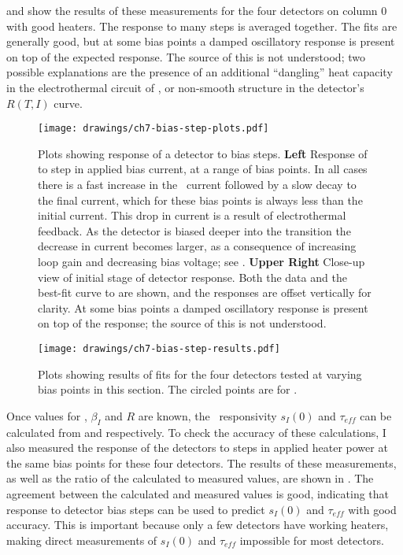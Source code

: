  and  show the results of these measurements for the four detectors on column 0 with good heaters.
The response to many steps is averaged together.
The fits are generally good, but at some bias points a damped oscillatory response is present on top of the expected  response.
The source of this is not understood; two possible explanations are the presence of an additional ``dangling'' heat capacity in the electrothermal circuit of  \cite{hoevers_thermal_2000,zink_array-compatible_2006,maasilta_complex_2012}, or non-smooth structure in the detector's $R(T,I)$ curve.

\begin{figure*}
  \centering
\texttt{[image: drawings/ch7-bias-step-plots.pdf]}
\caption[Plots showing response of a detector to bias steps]{
  Plots showing response of a detector to bias steps.
\textbf{Left}
Response of  to step in applied bias current, at a range of bias points.
In all cases there is a fast increase in the \TES\ current followed by a slow decay to the final current, which for these bias points is always less than the initial current.
This drop in current is a result of electrothermal feedback.
As the detector is biased deeper into the transition the decrease in current becomes larger, as a consequence of increasing loop gain and decreasing bias voltage; see .
\textbf{Upper Right}
Close-up view of initial stage of detector response.
Both the data and the best-fit curve to  are shown, and the responses are offset vertically for clarity.
At some bias points a damped oscillatory response is present on top of the  response; the source of this is not understood.
}
\label{fig:ch7-bias-step-plots}
\end{figure*}

\begin{figure*}
  \centering
\texttt{[image: drawings/ch7-bias-step-results.pdf]}
\caption[Results of bias step fits]{
  Plots showing results of fits for the four detectors tested at varying bias points in this section.
  The circled points are for \SOC.
}
\label{fig:ch7-bias-step-results}
\end{figure*}

Once values for \Loop, $\beta_I$ and $R$ are known, the \DC\ responsivity $s_I(0)$ and $\tau_{eff}$ can be calculated from  and  respectively.
To check the accuracy of these calculations, I also measured the response of the detectors to steps in applied heater power at the same bias points for these four detectors.
The results of these measurements, as well as the ratio of the calculated to measured values, are shown in .
The agreement between the calculated and measured values is good, indicating that response to detector bias steps can be used to predict $s_I(0)$ and $\tau_{eff}$ with good accuracy.
This is important because only a few detectors have working heaters, making direct measurements of $s_I(0)$ and $\tau_{eff}$ impossible for most detectors.

